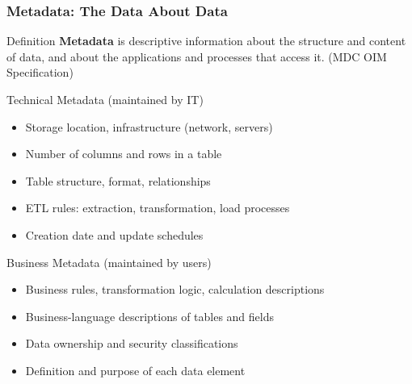 \begin{frame}
  \frametitle{Metadata: The Data About Data}

  \begin{block}{Definition}
    \textbf{Metadata} is descriptive information about the structure and
    content of data, and about the applications and processes that access it.
    \hfill\small(MDC OIM Specification)
  \end{block}

  \begin{block}{Technical Metadata (maintained by IT)}
    \begin{itemize}
      \item Storage location, infrastructure (network, servers)
      \item Number of columns and rows in a table
      \item Table structure, format, relationships
      \item ETL rules: extraction, transformation, load processes
      \item Creation date and update schedules
    \end{itemize}
  \end{block}

  \begin{block}{Business Metadata (maintained by users)}
    \begin{itemize}
      \item Business rules, transformation logic, calculation descriptions
      \item Business-language descriptions of tables and fields
      \item Data ownership and security classifications
      \item Definition and purpose of each data element
    \end{itemize}
  \end{block}
\end{frame}

